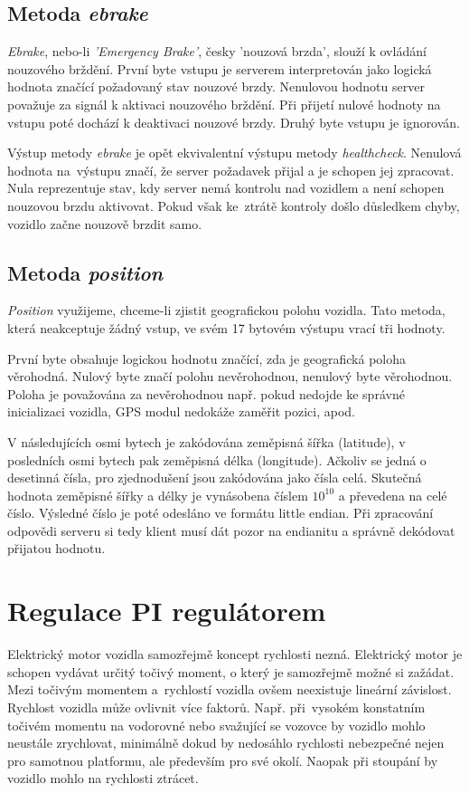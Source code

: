 \documentclass[czech, bachelor]{diploma}
\begin{document}
\subsection{Metoda \emph{ebrake}}
\emph{Ebrake}, nebo-li \emph{'Emergency Brake'}, česky 'nouzová brzda', slouží k ovládání nouzového brždění. První byte vstupu
je serverem interpretován jako logická hodnota značící požadovaný stav nouzové brzdy. Nenulovou hodnotu server považuje za signál
k aktivaci nouzového brždění. Při přijetí nulové hodnoty na vstupu poté dochází k deaktivaci nouzové brzdy. Druhý byte vstupu
je ignorován.

Výstup metody \emph{ebrake} je opět ekvivalentní výstupu metody \emph{healthcheck}. Nenulová hodnota na~výstupu značí, že server
požadavek přijal a je schopen jej zpracovat. Nula reprezentuje stav, kdy server nemá kontrolu nad vozidlem a není schopen
nouzovou brzdu aktivovat. Pokud však ke~ztrátě kontroly došlo důsledkem chyby, vozidlo začne nouzově brzdit samo.

\subsection{Metoda \emph{position}}

\emph{Position} využijeme, chceme-li zjistit geografickou polohu vozidla. Tato metoda, která neakceptuje žádný vstup, ve svém
17 bytovém výstupu vrací tři hodnoty.

První byte obsahuje logickou hodnotu značící, zda je geografická poloha věrohodná. Nulový byte značí polohu nevěrohodnou,
nenulový byte věrohodnou. Poloha je považována za nevěrohodnou např. pokud nedojde ke správné inicializaci vozidla, GPS modul
nedokáže zaměřit pozici, apod.

V následujících osmi bytech je zakódována zeměpisná šířka (latitude), v posledních osmi bytech pak zeměpisná délka (longitude).
Ačkoliv se jedná o desetinná čísla, pro zjednodušení jsou zakódována jako čísla celá. Skutečná hodnota zeměpisné šířky a délky
je vynásobena číslem $10^{10}$ a převedena na celé číslo. Výsledné číslo je poté odesláno ve formátu little endian. Při zpracování
odpovědi serveru si tedy klient musí dát pozor na endianitu a správně dekódovat přijatou hodnotu.

\section{Regulace PI regulátorem} \label{pi-controller}
Elektrický motor vozidla samozřejmě koncept rychlosti nezná. Elektrický motor je schopen vydávat určitý točivý moment, o který
je samozřejmě možné si zažádat. Mezi točivým momentem a~rychlostí vozidla ovšem neexistuje lineární závislost. Rychlost vozidla
může ovlivnit více faktorů. Např. při~vysokém konstatním točivém momentu na vodorovné nebo svažující se vozovce by vozidlo mohlo
neustále zrychlovat, minimálně dokud by nedosáhlo rychlosti nebezpečné nejen pro samotnou platformu, ale především pro své okolí.
Naopak při stoupání by vozidlo mohlo na rychlosti ztrácet.
\end{document}
